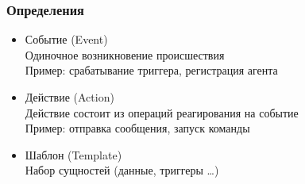 \begin{frame}[fragile]
    \frametitle{Определения}
        \begin{itemize}
            \item \alert{Событие (Event)}  \\
    Одиночное возникновение происшествия \\
    Пример: срабатывание триггера, регистрация агента
            \item \alert{Действие (Action)} \\
    Действие состоит из операций реагирования на событие \\
    Пример: отправка сообщения, запуск команды
            \item \alert{Шаблон (Template)} \\
    Набор сущностей (данные, триггеры …)
        \end{itemize}
\end{frame}